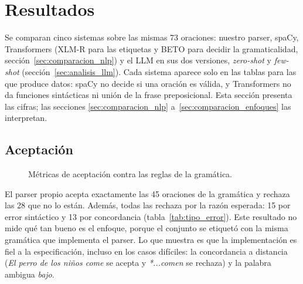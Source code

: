 \section{Resultados}
\label{sec:resultados}


Se comparan cinco sistemas sobre las mismas 73 oraciones: nuestro parser, spaCy, Transformers
(XLM-R para las etiquetas y BETO para decidir la gramaticalidad, sección~\ref{sec:comparacion_nlp})
y el LLM en sus dos versiones, \emph{zero-shot} y \emph{few-shot}
(sección~\ref{sec:analisis_llm}). Cada sistema aparece solo en las tablas para las que produce
datos: spaCy no decide si una oración es válida, y Transformers no da funciones sintácticas ni
unión de la frase preposicional. Esta sección presenta las cifras; las secciones
\ref{sec:comparacion_nlp} a~\ref{sec:comparacion_enfoques} las interpretan.

\subsection{Aceptación}

\begin{table}[h]
  \centering
  \small
  \par\medskip
  \caption{Aceptación contra \texttt{en\_gramatica} (arriba) y contra \texttt{espanol\_valido}
    (abajo). ``---'': la métrica no aplica al sistema.}
  \label{tab:aceptacion}
\end{table}

\begin{figure}[h]
  \centering
  \caption{Métricas de aceptación contra las reglas de la gramática.}
  \label{fig:aceptacion}
\end{figure}

El parser propio acepta exactamente las 45 oraciones de la gramática y rechaza las 28 que no
lo están. Además, todas las rechaza por la razón esperada: 15 por error sintáctico y 13 por
concordancia (tabla~\ref{tab:tipo_error}). Este resultado no mide qué tan bueno es el enfoque,
porque el conjunto se etiquetó con la misma gramática que implementa el parser. Lo que muestra
es que la implementación es fiel a la especificación, incluso en los casos difíciles: la
concordancia a distancia (\emph{El perro de los niños come} se acepta y \emph{*...comen} se
rechaza) y la palabra ambigua \emph{bajo}.

